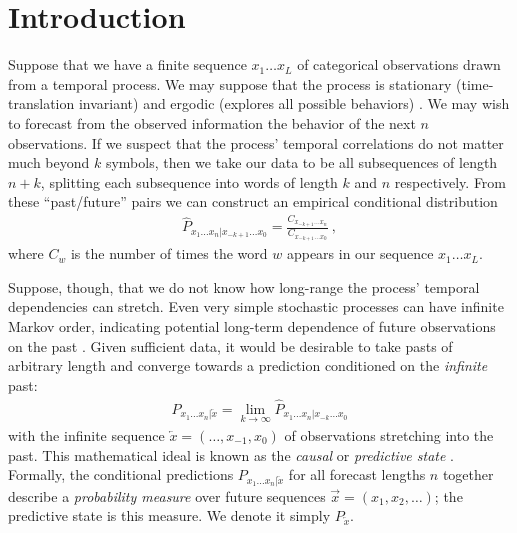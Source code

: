 \documentclass[sigconf, anonymous, review]{acmart}
\begin{document}


\maketitle

\section{Introduction}
Suppose that we have a finite sequence $x_1 \dots x_L$ of categorical
observations drawn from a temporal process. We may suppose that the process is
stationary (time-translation invariant) and ergodic (explores
all possible behaviors) \cite{Kall01a,Shal07a}. We may wish to forecast from the
observed information the behavior of the next $n$ observations. If we suspect
that the process' temporal correlations do not matter much beyond $k$ symbols,
then we take our data to be all subsequences of length $n+k$,
splitting each subsequence into words of length $k$ and $n$ respectively. From
these ``past/future'' pairs we can construct an empirical conditional
distribution
\begin{align*}
  \widehat{P}_{x_{1}\dots x_{n}|x_{-k+1}\dots x_0} = 
  \frac{C_{x_{-k+1}\dots x_{n}}}{C_{x_{-k+1}\dots x_0}}
  ~,
\end{align*}
where $C_{w}$ is the number of times the word $w$ appears in our sequence $x_1
\dots x_L$. 

Suppose, though, that we do not know how long-range the process' temporal
dependencies can stretch. Even very simple stochastic processes can have
infinite Markov order, indicating potential long-term dependence of future
observations on the past \cite{Uppe97a}. Given sufficient data, it would be
desirable to take pasts of arbitrary length and converge towards a prediction
conditioned on the \emph{infinite} past:
\begin{align}
  {P}_{x_{1}\dots x_{n}|\overleftarrow{x}}
  = \lim_{k\rightarrow\infty}
  \widehat{P}_{x_{1}\dots x_{n}|x_{-k}\dots x_0}
\label{eq:convergence}
\end{align}
with the infinite sequence $\overleftarrow{x} = (\dots,x_{-1},x_0)$ of
observations stretching into the past. This mathematical ideal is known as the
\emph{causal} or \emph{predictive state} \cite{Crut88a,Jaeg00a}. Formally, the
conditional predictions ${P}_{x_{1}\dots x_{n}|\overleftarrow{x}}$ for all
forecast lengths $n$ together describe a \emph{probability measure} over future
sequences $\overrightarrow{x} = (x_1,x_2,\dots)$; the predictive state is this
measure. We denote it simply $P_{\overleftarrow{x}}$.
\end{document}
